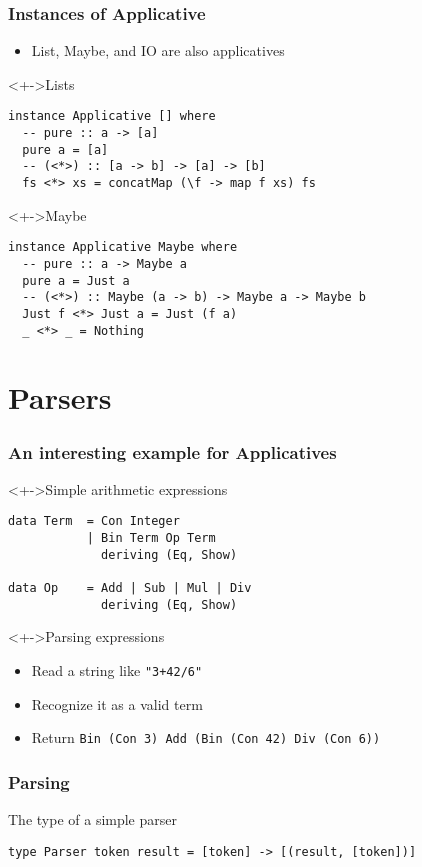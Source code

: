 \documentclass{beamer}
\begin{document}
\begin{frame}[fragile]
  \frametitle{Instances of Applicative}
  \begin{itemize}
  \item<+-> List, Maybe, and IO are also applicatives
  \end{itemize}
  \begin{block}<+->{Lists}
\begin{lstlisting}
instance Applicative [] where
  -- pure :: a -> [a]
  pure a = [a]
  -- (<*>) :: [a -> b] -> [a] -> [b]
  fs <*> xs = concatMap (\f -> map f xs) fs
\end{lstlisting}
  \end{block}
  \begin{block}<+->{Maybe}
\begin{lstlisting}
instance Applicative Maybe where
  -- pure :: a -> Maybe a
  pure a = Just a
  -- (<*>) :: Maybe (a -> b) -> Maybe a -> Maybe b
  Just f <*> Just a = Just (f a)
  _ <*> _ = Nothing
\end{lstlisting}
  \end{block}
\end{frame}

\section{Parsers}
\begin{frame}[fragile]
  \frametitle{An interesting example for Applicatives}
  \begin{block}<+->{Simple arithmetic expressions}
\begin{lstlisting}
data Term  = Con Integer
           | Bin Term Op Term  
             deriving (Eq, Show)
           
data Op    = Add | Sub | Mul | Div
             deriving (Eq, Show)
\end{lstlisting}
\end{block}
\begin{alertblock}<+->{Parsing expressions}
  \begin{itemize}
  \item Read a string like \texttt{"3+42/6"}
  \item Recognize it as a valid term
  \item Return \texttt{Bin (Con 3) Add (Bin (Con 42) Div (Con 6))} 
  \end{itemize}
\end{alertblock}
\end{frame}
\begin{frame}[fragile]
  \frametitle{Parsing}
\begin{block}{The type of a simple parser}
\begin{lstlisting}
type Parser token result = [token] -> [(result, [token])]
\end{lstlisting}  
\end{block}
\end{frame}             
\end{document}
